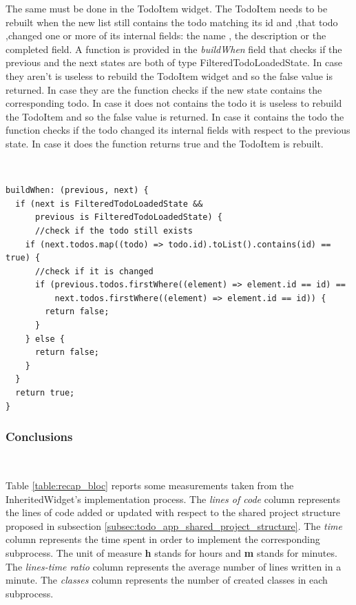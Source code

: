 The same must be done in the TodoItem widget. The TodoItem needs to be rebuilt when the new list still contains the todo matching its id and ,that todo ,changed one or more of its internal fields: the name , the description or the completed field. A function is provided in the \textit{buildWhen} field that checks if the previous and the next states are both of type FilteredTodoLoadedState. In case they aren’t is useless to rebuild the TodoItem widget and so the false value is returned. In case they are the function checks if the new state contains the corresponding todo. In case it does not contains the todo it is useless to rebuild the TodoItem and so the false value is returned. In case it contains the todo the function checks if the todo changed its internal fields with respect to the previous state. In case it does the function returns true and the  TodoItem is rebuilt.
\begin{code}
\mbox{}\\
 \mbox{}
\label{code:2.14}
\begin{verbatim}
buildWhen: (previous, next) {
  if (next is FilteredTodoLoadedState &&
      previous is FilteredTodoLoadedState) {
      //check if the todo still exists
    if (next.todos.map((todo) => todo.id).toList().contains(id) == true) {
      //check if it is changed
      if (previous.todos.firstWhere((element) => element.id == id) ==
          next.todos.firstWhere((element) => element.id == id)) {
        return false;
      }
    } else {
      return false;
    }
  }
  return true;
}
\end{verbatim}
\mbox{}
\end{code}




\subsubsection{Conclusions} \mbox{} \\
\label{subpar:render_optimizations_bloc}

Table \ref{table:recap_bloc} reports some measurements taken from the InheritedWidget's implementation process. The \textit{lines of code} column represents the lines of code added or updated with respect to the shared project structure proposed in subsection \ref{subsec:todo_app_shared_project_structure}. The \textit{time }column represents the time spent in order to implement the corresponding subprocess. The unit of measure \textbf{h} stands for hours and \textbf{m} stands for minutes. The \textit{lines-time ratio} column represents the average number of lines written in a minute. The \textit{classes} column represents the number of created classes in each subprocess.


